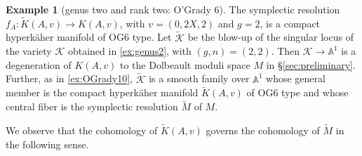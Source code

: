 \documentclass[11pt]{article}
\let\mathcal\mathscr
\theoremstyle{definition}
\newtheorem{exa}[thm]{Example}
\newcommand{\Aff}{\mathbb{A}}
\begin{document}
\begin{exa}[genus two and rank two: O'Grady 6]
The symplectic resolution $f_A \colon \widetilde{K}(A,v) \to K(A,v)$, with $v=(0,2X,2)$ and $g=2$, is a compact hyperkäher manifold of OG6 type. Let $\widetilde{\mathcal{K}}$ be the blow-up of the singular locus of the variety $\mathcal{K}$ obtained in \cref{ex:genus2}, with $(g,n)=(2,2)$. Then $\mathcal{K} \to \Aff^1$ is a degeneration of $K(A,v)$ to the Dolbeault moduli space $M$ in \S \ref{sec:preliminary}. Further, as in \cref{ex:OGrady10}, $\widetilde{\mathcal{K}}$ is a smooth family over $\Aff^1$ whose general member is the compact hyperkäher manifold $\widetilde{K}(A,v)$ of OG6 type and whose central fiber is the symplectic resolution $\widetilde{M}$ of $M$.

We observe that the cohomology of $\widetilde{K}(A,v)$ governs the cohomology of $\widetilde{M}$ in the following sense.


\end{exa}
\end{document}
